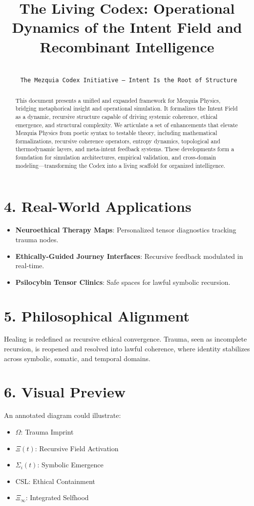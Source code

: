 \documentclass[12pt]{article}
\begin{document}
\section*{4. Real-World Applications}
\begin{itemize}
  \item \textbf{Neuroethical Therapy Maps}: Personalized tensor diagnostics tracking trauma nodes.
  \item \textbf{Ethically-Guided Journey Interfaces}: Recursive feedback modulated in real-time.
  \item \textbf{Psilocybin Tensor Clinics}: Safe spaces for lawful symbolic recursion.
\end{itemize}

\section*{5. Philosophical Alignment}
Healing is redefined as recursive ethical convergence. Trauma, seen as incomplete recursion, is reopened and resolved into lawful coherence, where identity stabilizes across symbolic, somatic, and temporal domains.

\section*{6. Visual Preview}
An annotated diagram could illustrate:
\begin{itemize}
  \item $\Omega$: Trauma Imprint
  \item $\Xi(t)$: Recursive Field Activation
  \item $\Sigma_i(t)$: Symbolic Emergence
  \item CSL: Ethical Containment
  \item $\Xi_{\infty}$: Integrated Selfhood
\end{itemize}

\title{The Living Codex: Operational Dynamics of the Intent Field and Recombinant Intelligence}
\author{\\ \texttt{\textcopyright{} The Mezquia Codex Initiative -- Intent Is the Root of Structure}}
\date{}

\maketitle

\begin{abstract}
This document presents a unified and expanded framework for Mezquia Physics, bridging metaphorical insight and operational simulation. It formalizes the Intent Field as a dynamic, recursive structure capable of driving systemic coherence, ethical emergence, and structural complexity. We articulate a set of enhancements that elevate Mezquia Physics from poetic syntax to testable theory, including mathematical formalizations, recursive coherence operators, entropy dynamics, topological and thermodynamic layers, and meta-intent feedback systems. These developments form a foundation for simulation architectures, empirical validation, and cross-domain modeling—transforming the Codex into a living scaffold for organized intelligence.
\end{abstract}
\end{document}
